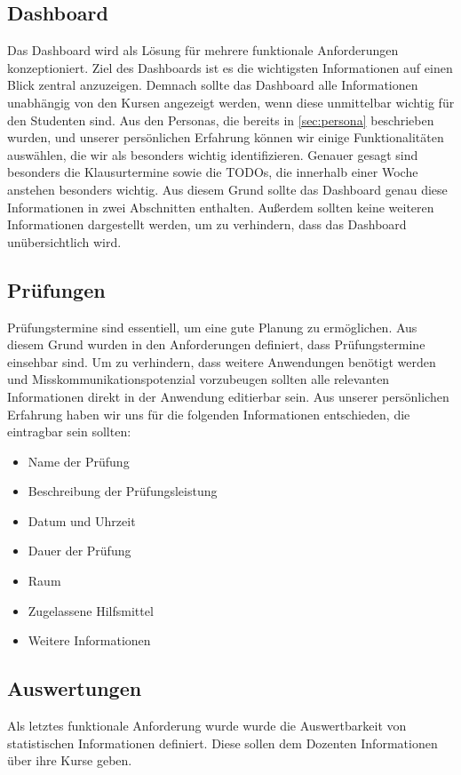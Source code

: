 \subsection{Dashboard}
Das Dashboard wird als Lösung für mehrere funktionale Anforderungen konzeptioniert.
Ziel des Dashboards ist es die wichtigsten Informationen auf einen Blick zentral anzuzeigen.
Demnach sollte das Dashboard alle Informationen unabhängig von den Kursen angezeigt werden, wenn diese unmittelbar wichtig für den Studenten sind.
Aus den Personas, die bereits in \autoref{sec:persona} beschrieben wurden, und unserer persönlichen Erfahrung können wir einige Funktionalitäten auswählen, die wir als besonders wichtig identifizieren.
Genauer gesagt sind besonders die Klausurtermine sowie die TODOs, die innerhalb einer Woche anstehen besonders wichtig.
Aus diesem Grund sollte das Dashboard genau diese Informationen in zwei Abschnitten enthalten.
Außerdem sollten keine weiteren Informationen dargestellt werden, um zu verhindern, dass das Dashboard unübersichtlich wird.

\subsection{Prüfungen}
Prüfungstermine sind essentiell, um eine gute Planung zu ermöglichen.
Aus diesem Grund wurden in den Anforderungen definiert, dass Prüfungstermine einsehbar sind.
Um zu verhindern, dass weitere Anwendungen benötigt werden und Misskommunikationspotenzial vorzubeugen sollten alle relevanten Informationen direkt in der Anwendung editierbar sein.
Aus unserer persönlichen Erfahrung haben wir uns für die folgenden Informationen entschieden, die eintragbar sein sollten:
\begin{itemize}
    \item Name der Prüfung
    \item Beschreibung der Prüfungsleistung
    \item Datum und Uhrzeit
    \item Dauer der Prüfung
    \item Raum
    \item Zugelassene Hilfsmittel
    \item Weitere Informationen
\end{itemize} 

\subsection{Auswertungen}
Als letztes funktionale Anforderung wurde wurde die Auswertbarkeit von statistischen Informationen definiert. Diese sollen dem Dozenten Informationen über ihre Kurse geben.

